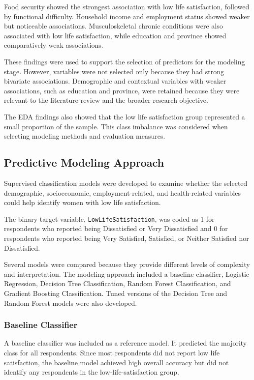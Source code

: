 \documentclass[12pt]{article}
\begin{document}
Food security showed the strongest association with low life satisfaction, followed by functional difficulty. Household income and employment status showed weaker but noticeable associations. Musculoskeletal chronic conditions were also associated with low life satisfaction, while education and province showed comparatively weak associations.

These findings were used to support the selection of predictors for the modeling stage. However, variables were not selected only because they had strong bivariate associations. Demographic and contextual variables with weaker associations, such as education and province, were retained because they were relevant to the literature review and the broader research objective.

The EDA findings also showed that the low life satisfaction group represented a small proportion of the sample. This class imbalance was considered when selecting modeling methods and evaluation measures.


\subsection{Predictive Modeling Approach}

Supervised classification models were developed to examine whether the selected demographic, socioeconomic, employment-related, and health-related variables could help identify women with low life satisfaction.

The binary target variable, \texttt{LowLifeSatisfaction}, was coded as 1 for respondents who reported being Dissatisfied or Very Dissatisfied and 0 for respondents who reported being Very Satisfied, Satisfied, or Neither Satisfied nor Dissatisfied.

Several models were compared because they provide different levels of complexity and interpretation. The modeling approach included a baseline classifier, Logistic Regression, Decision Tree Classification, Random Forest Classification, and Gradient Boosting Classification. Tuned versions of the Decision Tree and Random Forest models were also developed.

\subsubsection{Baseline Classifier}

A baseline classifier was included as a reference model. It predicted the majority class for all respondents. Since most respondents did not report low life satisfaction, the baseline model achieved high overall accuracy but did not identify any respondents in the low-life-satisfaction group.
\end{document}
